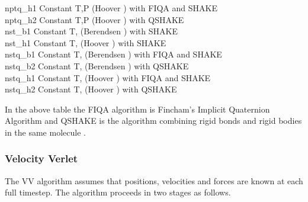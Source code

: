 \begin{tabbing}
{\sc nptq\_h1}  \>  Constant T,P (Hoover \cite{hoover-85a}) with FIQA and SHAKE\\
{\sc nptq\_h2}  \>  Constant T,P (Hoover \cite{hoover-85a}) with QSHAKE \\
{\sc nst\_b1}   \>  Constant T,\mat{\sigma} (Berendsen \cite{berendsen-84a}) with SHAKE \\
{\sc nst\_h1}   \>  Constant T,\mat{\sigma} (Hoover \cite{hoover-85a}) with SHAKE \\
{\sc nstq\_b1}  \>  Constant T,\mat{\sigma} (Berendsen \cite{berendsen-84a}) with FIQA and SHAKE\\
{\sc nstq\_b2}  \>  Constant T,\mat{\sigma} (Berendsen \cite{berendsen-84a}) with QSHAKE \\
{\sc nstq\_h1}  \>  Constant T,\mat{\sigma} (Hoover \cite{hoover-85a}) with
FIQA and SHAKE\\
{\sc nstq\_h2}  \>  Constant T,\mat{\sigma} (Hoover \cite{hoover-85a}) with QSHAKE \\
\end{tabbing}
In the above table the FIQA algorithm is Fincham's Implicit Quaternion
Algorithm \cite{fincham-92a} and QSHAKE is the \D{} algorithm combining
rigid bonds and rigid bodies in the same molecule \cite{forester-96a}.

\subsubsection{Velocity Verlet}

The VV algorithm assumes that positions, velocities and forces are
known at each full timestep. The algorithm proceeds in two stages as
follows.

